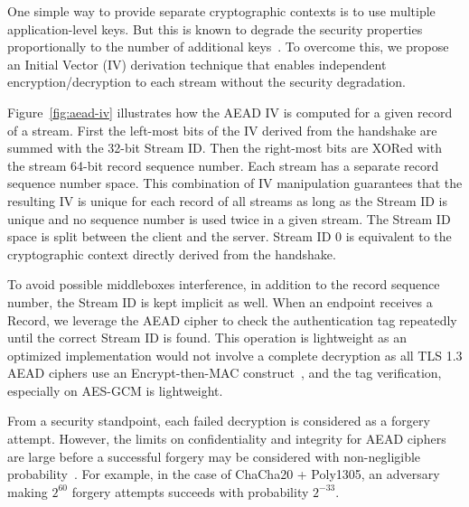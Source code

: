 One simple way to provide separate cryptographic contexts is to use multiple application-level
keys. But this is known to degrade the security properties proportionally to the number of
additional keys~\cite{chatterjee2011another}. To overcome this, we propose an
Initial Vector (IV) derivation technique that enables independent
encryption/decryption to each stream without the security degradation.

Figure~\ref{fig:aead-iv} illustrates how the AEAD IV is computed for a 
given \tcpls record of a \tcpls stream. First the left-most bits of the IV derived from the \tls handshake
are summed with the 32-bit \tcpls Stream ID. Then the right-most bits are XORed with the
stream 64-bit record sequence number. Each \tcpls stream has a separate record
sequence number space. This combination of IV manipulation guarantees that the
resulting IV is unique for each record of all \tcpls streams as long as the
Stream ID is unique and no sequence number is used twice in a given stream.
The Stream ID space is split between the client and the server. Stream ID 0 is 
equivalent to the cryptographic context directly derived from the handshake.

To avoid possible middleboxes interference, in addition to the record sequence number, 
the \tcpls Stream ID is kept implicit as well. When an endpoint receives a 
\tcpls Record, 
we leverage the AEAD cipher to check the authentication tag repeatedly until the
correct \tcpls Stream ID is found. This operation is lightweight as an optimized
implementation would not involve a complete decryption as all TLS 1.3 AEAD
ciphers use an Encrypt-then-MAC construct~\cite{rfc7366, rfc8446}, and the tag
verification, especially on AES-GCM is lightweight.

From a security standpoint, each failed decryption is considered as a
forgery attempt. However, the limits on confidentiality and
integrity for AEAD ciphers are large before a
successful forgery may be considered with non-negligible probability~\cite{luykx2015limits, aeadlimits}. For
example, in the case of ChaCha20 + Poly1305, an adversary making $2^{60}$ forgery
attempts succeeds with probability $2^{-33}$.


